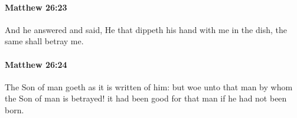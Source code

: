 		\paragraph{Matthew 26:23} %
			\label{MATTHEW-26-23}

			And he answered and said, He that dippeth his hand with me in the dish, the same shall betray me.

			\begin{framed}
			\scriptsize
				\begin{compactdesc}
					\item[SBLG] 
				\end{compactdesc}
			\end{framed}

		\paragraph{Matthew 26:24} %
			\label{MATTHEW-26-24}

			The Son of man goeth as it is written of him: but woe unto that man by whom the Son of man is betrayed! it had been good for that man if he had not been born.

